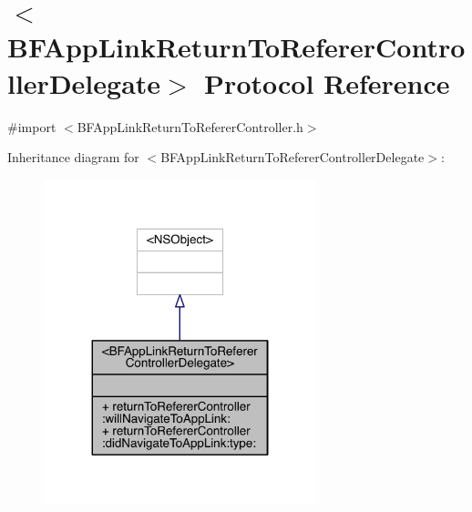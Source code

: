 \hypertarget{protocol_b_f_app_link_return_to_referer_controller_delegate-p}{\section{$<$B\-F\-App\-Link\-Return\-To\-Referer\-Controller\-Delegate$>$ Protocol Reference}
\label{protocol_b_f_app_link_return_to_referer_controller_delegate-p}
}


{\ttfamily \#import $<$B\-F\-App\-Link\-Return\-To\-Referer\-Controller.\-h$>$}



Inheritance diagram for $<$B\-F\-App\-Link\-Return\-To\-Referer\-Controller\-Delegate$>$\-:
\nopagebreak
\begin{figure}[H]
\begin{center}
\leavevmode
\includegraphics[width=224pt]{protocol_b_f_app_link_return_to_referer_controller_delegate-p__inherit__graph}
\end{center}
\end{figure}


